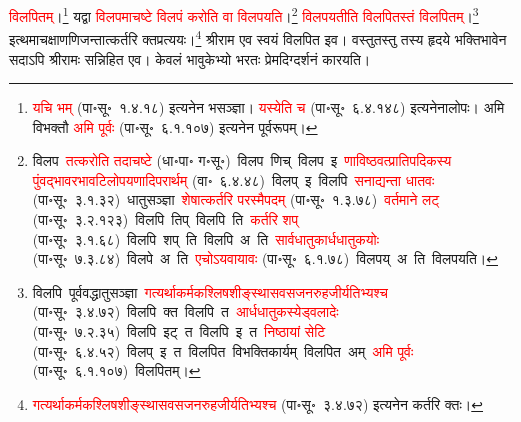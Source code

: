 \begin{sloppypar}
\textcolor{red}{विलपितम्}।\footnote{\textcolor{red}{यचि भम्} (पा॰सू॰~१.४.१८) इत्यनेन भसञ्ज्ञा। \textcolor{red}{यस्येति च} (पा॰सू॰~६.४.१४८) इत्यनेनालोपः। अमि विभक्तौ \textcolor{red}{अमि पूर्वः} (पा॰सू॰~६.१.१०७) इत्यनेन पूर्वरूपम्।} यद्वा \textcolor{red}{विलपमाचष्टे विलपं करोति वा विलपयति}।\footnote{विलप~\arrow \textcolor{red}{तत्करोति तदाचष्टे} (धा॰पा॰ ग॰सू॰)~\arrow विलप~णिच्~\arrow विलप~इ~\arrow \textcolor{red}{णाविष्ठवत्प्राति\-पदिकस्य पुंवद्भाव\-रभाव\-टिलोप\-यणादि\-परार्थम्} (वा॰~६.४.४८)~\arrow विलप्~इ~\arrow विलपि~\arrow \textcolor{red}{सनाद्यन्ता धातवः} (पा॰सू॰~३.१.३२)~\arrow धातु\-सञ्ज्ञा~\arrow \textcolor{red}{शेषात्कर्तरि परस्मैपदम्} (पा॰सू॰~१.३.७८)~\arrow \textcolor{red}{वर्तमाने लट्} (पा॰सू॰~३.२.१२३)~\arrow विलपि~तिप्~\arrow विलपि~ति~\arrow \textcolor{red}{कर्तरि शप्‌} (पा॰सू॰~३.१.६८)~\arrow विलपि~शप्~ति~\arrow विलपि~अ~ति~\arrow \textcolor{red}{सार्वधातुकार्ध\-धातुकयोः} (पा॰सू॰~७.३.८४)~\arrow विलपे~अ~ति~\arrow \textcolor{red}{एचोऽयवायावः} (पा॰सू॰~६.१.७८)~\arrow विलपय्~अ~ति~\arrow विलपयति।} \textcolor{red}{विलपयतीति विलपितस्तं विलपितम्}।\footnote{विलपि~\arrow पूर्ववद्धातुसञ्ज्ञा~\arrow \textcolor{red}{गत्यर्थाकर्मक\-श्लिष\-शीङ्स्थास\-वस\-जन\-रुह\-जी\-र्यतिभ्यश्च} (पा॰सू॰~३.४.७२)~\arrow विलपि~क्त~\arrow विलपि~त~\arrow \textcolor{red}{आर्धधातुकस्येड्वलादेः} (पा॰सू॰~७.२.३५)~\arrow विलपि~इट्~त~\arrow विलपि~इ~त~\arrow \textcolor{red}{निष्ठायां सेटि} (पा॰सू॰~६.४.५२)~\arrow विलप्~इ~त~\arrow विलपित~\arrow विभक्तिकार्यम्~\arrow विलपित~अम्~\arrow \textcolor{red}{अमि पूर्वः} (पा॰सू॰~६.१.१०७)~\arrow विलपितम्।} इत्थमाचक्षाण\-णिजन्तात्कर्तरि क्त\-प्रत्ययः।\footnote{\textcolor{red}{गत्यर्थाकर्मक\-श्लिष\-शीङ्स्थास\-वस\-जन\-रुह\-जीर्यतिभ्यश्च} (पा॰सू॰~३.४.७२) इत्यनेन कर्तरि क्तः।} श्रीराम एव स्वयं विलपित इव। वस्तुतस्तु तस्य हृदये भक्ति\-भावेन सदाऽपि श्रीरामः सन्निहित एव। केवलं भावुकेभ्यो भरतः प्रेम\-दिग्दर्शनं कारयति।\end{sloppypar}
